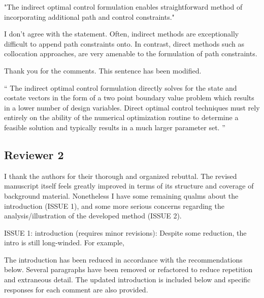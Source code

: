 \documentclass[11pt]{article}
\newenvironment{correction}{\begin{list}{}{\setlength{\leftmargin}{1cm}\setlength{\rightmargin}{1cm}}\vspace{\parsep}\item[]``}{''\end{list}}
\begin{document}
\begin{itemize}
\begin{itshape}
"The indirect optimal control formulation enables straightforward method of incorporating additional path and control constraints."  

I don't agree with the statement. Often, indirect methods are exceptionally difficult to append path constraints onto.  In contrast, direct methods such as collocation approaches, are very amenable to the formulation of path constraints.
    \end{itshape}
    
    Thank you for the comments. This sentence has been modified.
    \begin{correction}
        The indirect optimal control formulation directly solves for the state and costate vectors in the form of a two point boundary value problem which results in a lower number of design variables.
        Direct optimal control techniques must rely entirely on the ability of the numerical optimization routine to determine a feasible solution and typically results in a much larger parameter set.
    \end{correction}
\end{itemize}
\subsection*{Reviewer 2}

\begin{itshape}
I thank the authors for their thorough and organized rebuttal.  The revised manuscript itself feels greatly improved in terms of its structure and coverage of background material.  Nonetheless I have some remaining qualms about the introduction (ISSUE 1), and some more serious concerns regarding the analysis/illustration of the developed method (ISSUE 2). 
\end{itshape}

\begin{itshape}
ISSUE 1: introduction (requires minor revisions): 
Despite some reduction, the intro is still long-winded.  For example,
\end{itshape}

The introduction has been reduced in accordance with the recommendations below.
Several paragraphs have been removed or refactored to reduce repetition and extraneous detail.
The updated introduction is included below and specific responses for each comment are also provided.
\end{document}
